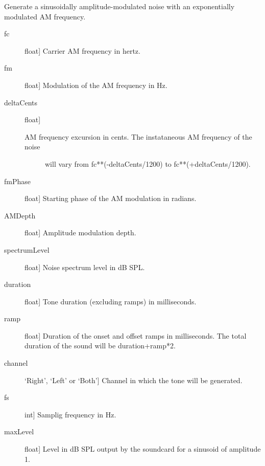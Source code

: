 \documentclass[letterpaper,10pt,english]{sphinxmanual}
\begin{document}
\begin{fulllineitems}
\label{index:sndlib.expAMNoise}
Generate a sinusoidally amplitude-modulated noise with an exponentially
modulated AM frequency.
\begin{description}
\item[{fc}] \leavevmode{[}float{]}
Carrier AM frequency in hertz.

\item[{fm}] \leavevmode{[}float{]}
Modulation of the AM frequency in Hz.

\item[{deltaCents}] \leavevmode{[}float{]}\begin{description}
\item[{AM frequency excursion in cents. The instataneous AM frequency of the noise}] \leavevmode
will vary from fc**(-deltaCents/1200) to fc**(+deltaCents/1200).

\end{description}

\item[{fmPhase}] \leavevmode{[}float{]}
Starting phase of the AM modulation in radians.

\item[{AMDepth}] \leavevmode{[}float{]}
Amplitude modulation depth.

\item[{spectrumLevel}] \leavevmode{[}float{]}
Noise spectrum level in dB SPL.

\item[{duration}] \leavevmode{[}float{]}
Tone duration (excluding ramps) in milliseconds.

\item[{ramp}] \leavevmode{[}float{]}
Duration of the onset and offset ramps in milliseconds.
The total duration of the sound will be duration+ramp*2.

\item[{channel}] \leavevmode{[}`Right', `Left' or `Both'{]}
Channel in which the tone will be generated.

\item[{fs}] \leavevmode{[}int{]}
Samplig frequency in Hz.

\item[{maxLevel}] \leavevmode{[}float{]}
Level in dB SPL output by the soundcard for a sinusoid of
amplitude 1.


\end{description}
\end{fulllineitems}
\end{document}
